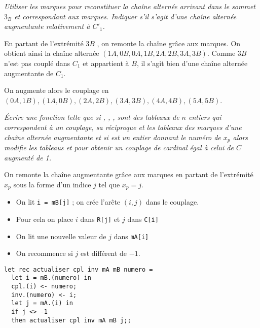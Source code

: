 \begin{Exercise}\it
Utiliser les marques pour reconstituer la chaîne alternée arrivant dans le sommet $3_B$ et correspondant aux marques.
Indiquer s'il s'agit d'une chaîne alternée augmentante relativement à $C'_1$.
\end{Exercise}
\begin{Answer}
En partant de l'extrémité $3B$ , on remonte la chaîne grâce aux marques. On obtient ainsi la chaîne alternée $(1A , 0B , 0A , 1B , 2A , 2B , 3A , 3B )$. Comme $3B$ n'est pas couplé dans $C_1$ et appartient à $B$, il s'agit bien d'une chaîne alternée augmentante de $C_1$.

On augmente alors le couplage en
 $(0A , 1B ), (1A , 0B ), (2A , 2B ), (3A , 3B ), (4A , 4B ), (5A , 5B )$.
\end{Answer}
\begin{Exercise}\it
Écrire une fonction  telle que si , , ,  sont des tableaux de $n$ entiers qui correspondent à un couplage, sa réciproque et les tableaux des marques d'une chaîne alternée augmentante et si  est un entier donnant le numéro de $x_p$ alors  modifie les tableaus  et  pour obtenir un couplage de cardinal égal à celui de $C$ augmenté de 1.
\end{Exercise}
\begin{Answer}
On remonte la chaîne augmentante grâce aux marques en partant de l'extrémité $x_p$ sous la forme d'un indice $j$ tel que $x_p=j$.

\begin{itemize}
  \item On lit \texttt{i = mB[j]} ; on crée l'arête $(i,j)$ dans le couplage.
   \item Pour cela on place $i$ dans \texttt{R[j]} et $j$ dans \texttt{C[i]}
  \item On lit une nouvelle valeur de $j$ dans \texttt{mA[i]}
  \item On recommence si $j$ est différent de $-1$.
\end{itemize}


\begin{lstlisting}
let rec actualiser cpl inv mA mB numero =
  let i = mB.(numero) in 
  cpl.(i) <- numero;
  inv.(numero) <- i;
  let j = mA.(i) in
  if j <> -1
  then actualiser cpl inv mA mB j;;
\end{lstlisting}
\end{Answer}
